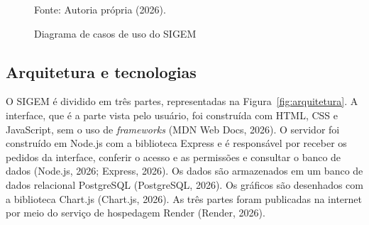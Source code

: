 \documentclass[12pt,a4paper]{article}
\newcommand{\ator}[4]{%
  \begin{scope}[shift={#1}]
    \draw[thick] (0,0.62) circle (0.17);
    \draw[thick] (0,0.45) -- (0,-0.12);
    \draw[thick] (-0.3,0.25) -- (0.3,0.25);
    \draw[thick] (0,-0.12) -- (-0.22,-0.52);
    \draw[thick] (0,-0.12) -- (0.22,-0.52);
    \node[font=\small, below, align=center] at (0,-0.55) {#3};
    \coordinate (#2) at ({#4*0.34},0.25);
  \end{scope}%
}
\begin{document}
\begin{figure}[!htbp]
  \centering
  \caption{Diagrama de casos de uso do SIGEM}
  \label{fig:casos}
  \par\smallskip
  {\small Fonte: Autoria própria (2026).}
\end{figure}

\subsection{Arquitetura e tecnologias}

O SIGEM é dividido em três partes, representadas na Figura~\ref{fig:arquitetura}. A interface, que é a parte vista pelo usuário, foi construída com HTML, CSS e JavaScript, sem o uso de \textit{frameworks} (MDN Web Docs, 2026). O servidor foi construído em Node.js com a biblioteca Express e é responsável por receber os pedidos da interface, conferir o acesso e as permissões e consultar o banco de dados (Node.js, 2026; Express, 2026). Os dados são armazenados em um banco de dados relacional PostgreSQL (PostgreSQL, 2026). Os gráficos são desenhados com a biblioteca Chart.js (Chart.js, 2026). As três partes foram publicadas na internet por meio do serviço de hospedagem Render (Render, 2026).
\end{document}
